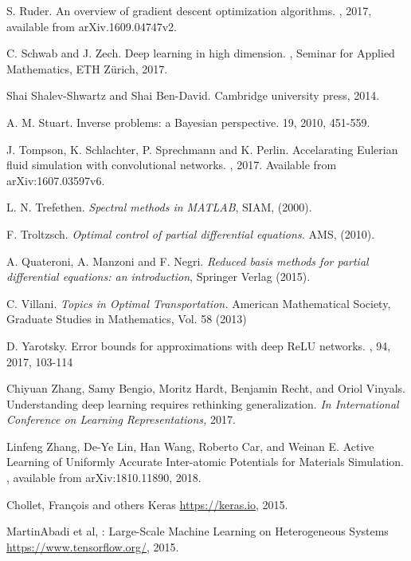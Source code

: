 \documentclass[a4paper]{article}
\numberwithin{equation}{section}
\numberwithin{equation}{section}
\theoremstyle{definition}
\theoremstyle{myremarkstyle}
\begin{document}
\begin{thebibliography}{99}
S. Ruder.
\newblock An overview of gradient descent optimization algorithms.
, 2017, available from arXiv.1609.04747v2.

C. Schwab and J. Zech.
\newblock Deep learning in high dimension.
\newblock {}, Seminar for Applied Mathematics,
ETH Z\"urich, 2017.

Shai Shalev-Shwartz and Shai Ben-David.
\newblock Cambridge university press, 2014.

A. M. Stuart.
\newblock Inverse problems: a Bayesian perspective.
 19, 2010, 451-559.

J. Tompson, K. Schlachter, P. Sprechmann and K. Perlin.
\newblock Accelarating Eulerian fluid simulation with convolutional networks.
, 2017. Available from arXiv:1607.03597v6.

L. N. Trefethen.
\newblock \emph{Spectral methods in MATLAB},
\newblock SIAM, (2000).

F. Troltzsch.
\newblock \emph{Optimal control of partial differential equations.}
\newblock AMS, (2010). 

A. Quateroni, A. Manzoni and F. Negri.
\newblock \emph{Reduced basis methods for partial differential equations: an introduction},
\newblock Springer Verlag (2015).

C. Villani.
\newblock \textit{Topics in Optimal Transportation.}
\newblock American Mathematical Society, Graduate Studies in Mathematics, Vol. 58 (2013)

D. Yarotsky. 
\newblock Error bounds for approximations with deep ReLU networks. 
, 
94, 2017, 103-114

Chiyuan Zhang, Samy Bengio, Moritz Hardt, Benjamin Recht, and Oriol Vinyals. 
\newblock Understanding
deep learning requires rethinking generalization. 
{\em In International Conference on Learning
Representations,} 2017.

Linfeng Zhang, De-Ye Lin, Han Wang, Roberto Car, and Weinan E.
\newblock Active Learning of Uniformly Accurate Inter-atomic Potentials for Materials Simulation.
, available from  arXiv:1810.11890, 2018.

Chollet, Fran\c{c}ois and others
\newblock Keras
\newblock \url{https://keras.io}, 2015.

MartinAbadi et al,
: Large-Scale Machine Learning on Heterogeneous Systems
\newblock \url{https://www.tensorflow.org/}, 2015.

\end{thebibliography}
\end{document}

